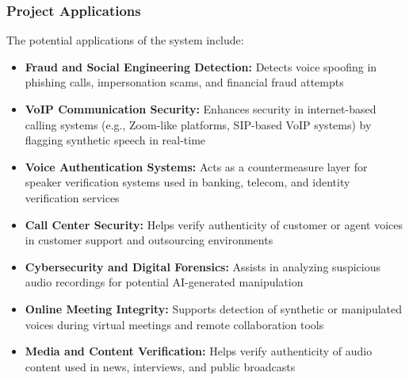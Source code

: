 \subsubsection{Project Applications}

The potential applications of the system include:
\begin{itemize}
    \item \textbf{Fraud and Social Engineering Detection:} Detects voice spoofing in phishing calls, impersonation scams, and financial fraud attempts
    \item \textbf{VoIP Communication Security:} Enhances security in internet-based calling systems (e.g., Zoom-like platforms, SIP-based VoIP systems) by flagging synthetic speech in real-time
    \item \textbf{Voice Authentication Systems:} Acts as a countermeasure layer for speaker verification systems used in banking, telecom, and identity verification services
    \item \textbf{Call Center Security:} Helps verify authenticity of customer or agent voices in customer support and outsourcing environments
    \item \textbf{Cybersecurity and Digital Forensics:} Assists in analyzing suspicious audio recordings for potential AI-generated manipulation
    \item \textbf{Online Meeting Integrity:} Supports detection of synthetic or manipulated voices during virtual meetings and remote collaboration tools
    \item \textbf{Media and Content Verification:} Helps verify authenticity of audio content used in news, interviews, and public broadcasts
\end{itemize}
